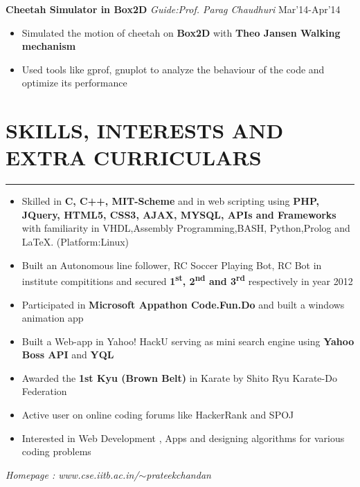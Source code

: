 \documentclass[11pt]{article} %
\begin{document}
\noindent \textbf{Cheetah Simulator in Box2D} \hfill 
\textit{Guide:Prof. Parag Chaudhuri} Mar'14-Apr'14
\vspace{-3mm}
\begin{itemize}
\itemsep-0.3em
\item Simulated the motion of cheetah on {\bf Box2D} with \textbf{Theo Jansen Walking mechanism}
\item Used tools like gprof, gnuplot to analyze the behaviour of the code and optimize its performance
\end{itemize}
\vspace{-5mm}

\section*{SKILLS, INTERESTS AND EXTRA CURRICULARS}
\hrule
\medskip
\begin{itemize}
\itemsep-0.4em
\item Skilled in \textbf{C, C++, MIT-Scheme} and in web scripting using \textbf{PHP, JQuery, HTML5, CSS3, AJAX, MYSQL, APIs and Frameworks } with familiarity in VHDL,Assembly Programming,BASH, Python,Prolog and \LaTeX. (Platform:Linux)
\item Built an Autonomous line follower, RC Soccer Playing Bot, RC Bot in institute compititions and secured {\bf 1\textsuperscript{st}, 2\textsuperscript{nd} and 3\textsuperscript{rd}} respectively in year 2012
\item Participated in \textbf{Microsoft Appathon Code.Fun.Do} and built a windows animation app
\item Built a Web-app in Yahoo! HackU serving as mini search engine using \textbf{Yahoo Boss API} and \textbf{YQL}
\item Awarded the \textbf{1st Kyu (Brown Belt)} in Karate by Shito Ryu Karate-Do Federation
\item Active user on online coding forums like HackerRank and SPOJ
\item Interested in Web Development , Apps and designing algorithms for various coding problems

\end{itemize}
\textit{Homepage : www.cse.iitb.ac.in/$\sim$prateekchandan}
\end{document}
